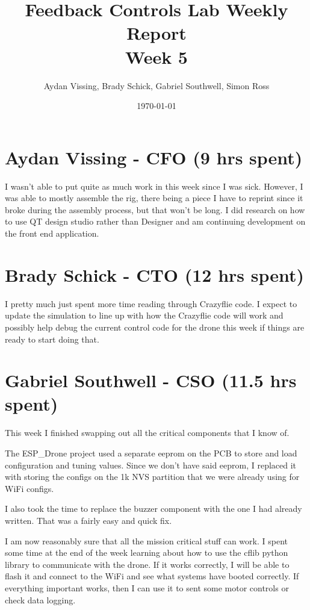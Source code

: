 \documentclass[12pt, titlepage]{article}
\title{Feedback Controls Lab Weekly Report \\ \normalsize{Week 5}}
\author{Aydan Vissing, Brady Schick, Gabriel Southwell, Simon Ross}
\date{\today}
\begin{document}
\maketitle

\section*{Aydan Vissing - CFO (9 hrs spent)}

I wasn't able to put quite as much work in this week since I was sick. However, I was able to mostly assemble the rig, there being a piece I have to reprint since it broke during the assembly process, but that won't be long. I did research on how to use QT design studio rather than Designer and am continuing development on the front end application. 

\section*{Brady Schick - CTO (12 hrs spent)}

I pretty much just spent more time reading through Crazyflie code. I expect to update the simulation to line up with how the Crazyflie code will work and possibly help debug the current control code for the drone this week if things are ready to start doing that.

\section*{Gabriel Southwell - CSO (11.5 hrs spent)}

This week I finished swapping out all the critical components that I know of. 

The ESP\_Drone project used a separate eeprom on the PCB to store and load configuration and tuning values. Since we don't have said eeprom, I replaced it with storing the configs on the 1k NVS partition that we were already using for WiFi configs. 

I also took the time to replace the buzzer component with the one I had already written. That was a fairly easy and quick fix. 

I am now reasonably sure that all the mission critical stuff can work. I spent some time at the end of the week learning about how to use the cflib python library to communicate with the drone. If it works correctly, I will be able to flash it and connect to the WiFi and see what systems have booted correctly. If everything important works, then I can use it to sent some motor controls or check data logging. 
\end{document}
